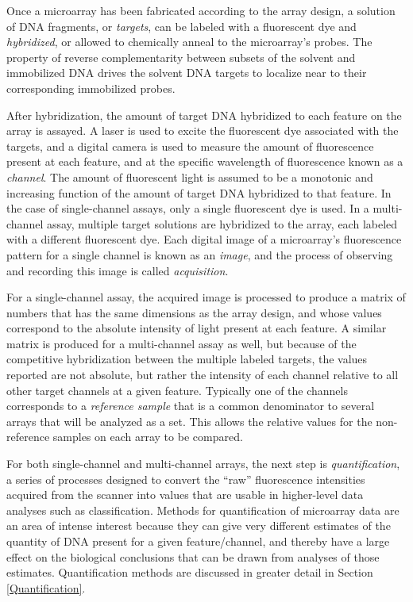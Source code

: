 Once a microarray has been fabricated according to the array design, a solution
of DNA fragments, or \emph{targets}, can be labeled with a fluorescent dye and
\emph{hybridized}, or allowed to chemically anneal to the microarray's probes.
The property of reverse complementarity between subsets of the solvent and
immobilized DNA drives the solvent DNA targets to localize near to their
corresponding immobilized probes.

After hybridization, the amount of target DNA hybridized to each feature on the
array is assayed.  A laser is used to excite the fluorescent dye associated
with the targets, and a digital camera is used to measure the amount of
fluorescence present at each feature, and at the specific wavelength of
fluorescence known as a \emph{channel}.  The amount of fluorescent light is
assumed to be a monotonic and increasing function of the amount of target DNA
hybridized to that feature.  In the case of single-channel assays, only a
single fluorescent dye is used.  In a multi-channel assay, multiple target
solutions are hybridized to the array, each labeled with a different
fluorescent dye.  Each digital image of a microarray's fluorescence pattern for
a single channel is known as an \emph{image}, and the process of observing and
recording this image is called \emph{acquisition}.

For a single-channel assay, the acquired image is processed to produce a matrix
of numbers that has the same dimensions as the array design, and whose values
correspond to the absolute intensity of light present at each feature.  A
similar matrix is produced for a multi-channel assay as well, but because of
the competitive hybridization between the multiple labeled targets, the values
reported are not absolute, but rather the intensity of each channel relative to
all other target channels at a given feature.  Typically one of the channels
corresponds to a \emph{reference sample} that is a common denominator to
several arrays that will be analyzed as a set.  This allows the relative values
for the non-reference samples on each array to be compared.

For both single-channel and multi-channel arrays, the next step is
\emph{quantification}, a series of processes designed to convert the ``raw''
fluorescence intensities acquired from the scanner into values that are usable
in higher-level data analyses such as classification.  Methods for
quantification of microarray data are an area of intense interest
\cite{XXX,XXX,XXX} because they can give very different estimates of the
quantity of DNA present for a given feature/channel, and thereby have a large
effect on the biological conclusions that can be drawn from analyses of those
estimates.  Quantification methods are discussed in greater detail in Section
\ref{Quantification}.

